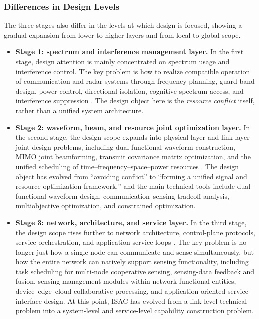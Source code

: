 \subsubsection{Differences in Design Levels}
\label{subsubsec:ch1-design-level-differences}

The three stages also differ in the levels at which design is focused, showing a gradual expansion from lower to higher layers and from local to global scope.
\begin{itemize}
    \item \textbf{Stage 1: spectrum and interference management layer.}  
    In the first stage, design attention is mainly concentrated on spectrum usage and interference control. The key problem is how to realize compatible operation of communication and radar systems through frequency planning, guard-band design, power control, directional isolation, cognitive spectrum access, and interference suppression \cite{Chiriyath2017RadarCommCoexistence,Blunt2018RadarSpectrumSharing}. The design object here is the \emph{resource conflict} itself, rather than a unified system architecture.
    
    \item \textbf{Stage 2: waveform, beam, and resource joint optimization layer.}  
    In the second stage, the design scope expands into physical-layer and link-layer joint design problems, including dual-functional waveform construction, MIMO joint beamforming, transmit covariance matrix optimization, and the unified scheduling of time--frequency--space--power resources \cite{Liu2020JointRadarComm,Zhang2021ISAC6G,Sturm2011WaveformDesign}. The design object has evolved from ``avoiding conflict'' to ``forming a unified signal and resource optimization framework,'' and the main technical tools include dual-functional waveform design, communication--sensing tradeoff analysis, multiobjective optimization, and constrained optimization.
    
    \item \textbf{Stage 3: network, architecture, and service layer.}  
    In the third stage, the design scope rises further to network architecture, control-plane protocols, service orchestration, and application service loops \cite{Gonzalez2024integrated,Zhang2020perceptive,Cui2024integrated}. The key problem is no longer just how a single node can communicate and sense simultaneously, but how the entire network can natively support sensing functionality, including task scheduling for multi-node cooperative sensing, sensing-data feedback and fusion, sensing management modules within network functional entities, device--edge--cloud collaborative processing, and application-oriented service interface design. At this point, ISAC has evolved from a link-level technical problem into a system-level and service-level capability construction problem.
\end{itemize}

